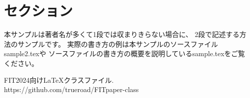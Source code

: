 \documentclass{FITpaper}
\begin{document}
\maketitle

\section{セクション}

本サンプルは著者名が多くて1段では収まりきらない場合に、
2段で記述する方法のサンプルです。
実際の書き方の例は本サンプルのソースファイルsample2.texや
ソースファイルの書き方の概要を説明しているsample.texをご覧ください。

\begin{thebibliography}{9}

  FIT2024向け\LaTeX クラスファイル. \\
  https://github.com/trueroad/FITpaper-class

\end{thebibliography}
\end{document}
